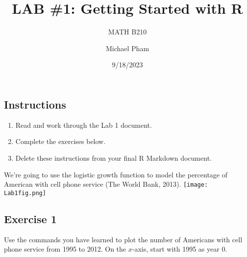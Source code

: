 \documentclass[
]{article}
\title{LAB \#1: Getting Started with R}
\subtitle{MATH B210}
\author{Michael Pham}
\date{9/18/2023}
\providecommand{\tightlist}{%
  \setlength{\itemsep}{0pt}\setlength{\parskip}{0pt}}
\begin{document}
\maketitle

\hypertarget{instructions}{%
\subsection{Instructions}\label{instructions}}

\begin{enumerate}
\def\labelenumi{\arabic{enumi}.}
\tightlist
\item
  Read and work through the Lab 1 document.
\item
  Complete the exercises below.
\item
  Delete these instructions from your final R Markdown document.
\end{enumerate}

We're going to use the logistic growth function to model the percentage
of American with cell phone service (The World Bank, 2013).
\texttt{[image: Lab1fig.png]}

\hypertarget{exercise-1}{%
\subsection{Exercise 1}\label{exercise-1}}

Use the commands you have learned to plot the number of Americans with
cell phone service from 1995 to 2012. On the \(x\)-axis, start with 1995
as year 0.
\end{document}
